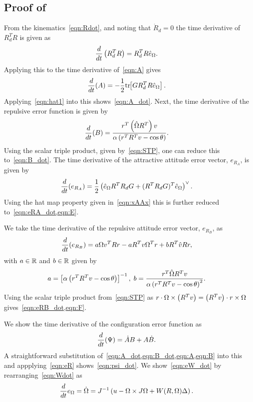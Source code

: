 \documentclass[10pt,fleqn]{IJCAS}  %
\begin{document}
\begin{multicols}{2}
\subsection{Proof of~}\label{proof:error_dyn}
From the kinematics~\cref{eqn:Rdot}, and noting that \( \dot{R}_d = 0 \) the time derivative of \( R_d^T R \) is given as
\begin{gather*}
	\frac{d }{d t} \left( R_d^T R \right) = R_d^T R \hat{e}_\Omega .
\end{gather*}
Applying this to the time derivative of~\cref{eqn:A} gives
\begin{gather*}
	\frac{d }{d t} (A) = -\frac{1}{2} \mathrm{tr}\negthickspace\left[ G R_d^T R \hat{e}_\Omega \right] .
\end{gather*}
Applying~\cref{eqn:hat1} into this shows~\cref{eqn:A_dot}.
Next, the time derivative of the repulsive error function is given by
\begin{gather*}
	\frac{d }{d t} (B) = \frac{r^T \left( \hat{\Omega} R^T \right) v}{\alpha \left( r^T R^T v - \cos \theta \right)} .
\end{gather*}
Using the scalar triple product, given by~\cref{eqn:STP}, one can reduce this to~\cref{eqn:B_dot}.
The time derivative of the attractive attitude error vector, \( e_{R_A} \), is given by
\begin{gather*}
	\frac{d }{d t} ( e_{R_A}) = \frac{1}{2} \left( \hat{e}_\Omega R^T R_d G + (R^T R_d G)^T \hat{e}_\Omega \right)^\vee .
\end{gather*}
Using the hat map property given in~\cref{eqn:xAAx} this is further reduced to~\cref{eqn:eRA_dot,eqn:E}.

We take the time derivative of the repulsive attitude error vector, \( e_{R_B} \), as
\begin{gather*}
	\frac{d }{d t}( e_{R_B} )= a \Omega v^T R r - a R^T v \Omega^T r + b R^T \hat{v} R r ,
\end{gather*}
with \( a \in \mathbb{R} \) and \( b \in \mathbb{R}\) given by 
\begin{gather*}
	a = \left[ \alpha \left( r^T R^T v - \cos \theta \right) \right]^{-1} , \;
	b = \frac{r^T \hat{\Omega} R^T v}{\alpha \left( r^T R^T v - \cos \theta \right)^2} .
\end{gather*}
Using the scalar triple product from~\cref{eqn:STP} as \( r \cdot \Omega \times \left( R^T v \right) = \left( R^T v \right) \cdot r \times \Omega \) gives~\cref{eqn:eRB_dot,eqn:F}.

We show the time derivative of the configuration error function as
\begin{gather*}
	\frac{d }{d t} (\Psi) = \dot{A} B + A \dot{B} .
\end{gather*}
A straightforward substitution of~\cref{eqn:A_dot,eqn:B_dot,eqn:A,eqn:B} into this and appplying~\cref{eqn:eR} shows~\cref{eqn:psi_dot}.
We show~\cref{eqn:eW_dot} by rearranging~\cref{eqn:Wdot} as 
\begin{align*}
	\frac{d }{d t} e_\Omega = \dot{\Omega} = J^{-1} \left( u - \Omega \times J \Omega + W(R,\Omega) \Delta  \right) .
\end{align*}


\end{multicols}
\end{document}
